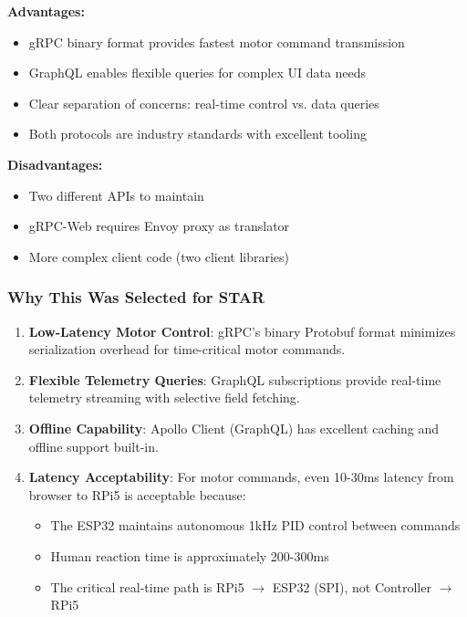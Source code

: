 \documentclass[11pt,letterpaper]{article}
\begin{document}
\textbf{Advantages:}
\begin{itemize}
    \item gRPC binary format provides fastest motor command transmission
    \item GraphQL enables flexible queries for complex UI data needs
    \item Clear separation of concerns: real-time control vs. data queries
    \item Both protocols are industry standards with excellent tooling
\end{itemize}

\textbf{Disadvantages:}
\begin{itemize}
    \item Two different APIs to maintain
    \item gRPC-Web requires Envoy proxy as translator
    \item More complex client code (two client libraries)
\end{itemize}

\subsubsection{Why This Was Selected for STAR}

\begin{enumerate}
    \item \textbf{Low-Latency Motor Control}: gRPC's binary Protobuf format minimizes serialization overhead for time-critical motor commands.

    \item \textbf{Flexible Telemetry Queries}: GraphQL subscriptions provide real-time telemetry streaming with selective field fetching.

    \item \textbf{Offline Capability}: Apollo Client (GraphQL) has excellent caching and offline support built-in.

    \item \textbf{Latency Acceptability}: For motor commands, even 10-30ms latency from browser to RPi5 is acceptable because:
    \begin{itemize}
        \item The ESP32 maintains autonomous 1kHz PID control between commands
        \item Human reaction time is approximately 200-300ms
        \item The critical real-time path is RPi5 $\rightarrow$ ESP32 (SPI), not Controller $\rightarrow$ RPi5
    \end{itemize}
\end{enumerate}
\end{document}
